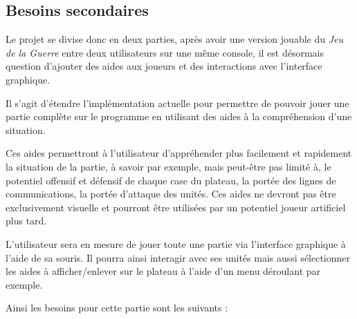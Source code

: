 \documentclass[a4paper]{report}
\begin{document}
\subsection{Besoins secondaires} %
Le projet se divise donc en deux parties, après avoir une version jouable du \textit{Jeu de la Guerre} entre deux utilisateurs sur une même console, il est désormais question d'ajouter des aides aux joueurs et des interactions avec l'interface graphique.

Il s'agit d'étendre l'implémentation actuelle pour permettre de pouvoir jouer une partie complète sur le programme en utilisant des aides à la compréhension d'une situation.

Ces aides permettront à l'utilisateur d'appréhender plus facilement et rapidement la situation de la partie, à savoir par exemple, mais peut-être pas limité à, le potentiel offensif et défensif de chaque case du plateau, la portée des lignes de communications, la portée d'attaque des unités. Ces aides ne devront pas être exclusivement visuelle et pourront être utilisées par un potentiel joueur artificiel plus tard.

L'utilisateur sera en mesure de jouer toute une partie via l'interface graphique à l'aide de sa souris. Il pourra ainsi interagir avec ses unités mais aussi sélectionner les aides à afficher/enlever sur le plateau à l'aide d'un menu déroulant par exemple.
\newline

Ainsi les besoins pour cette partie sont les suivants :

\end{document}
